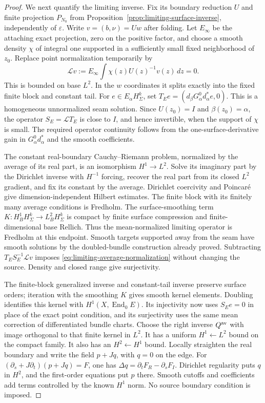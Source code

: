 \documentclass[11pt]{amsart}
\theoremstyle{definition}
\theoremstyle{remark}
\theoremstyle{plain}
\newcommand{\End}{\operatorname{End}}
\begin{document}
\begin{proof}
We next quantify the limiting inverse. Fix its boundary
reduction $U$ and finite projection $P_{N_0}$ from
Proposition~\ref{prop:limiting-surface-inverse}, independently
of $\varepsilon$. Write $v=(b,\nu)=Uw$ after folding. Let
$E_\infty$ be the attaching exact projection, zero on the
positive factor, and choose a smooth density $\chi$ of
integral one supported in a sufficiently small fixed
neighborhood of $z_0$. Replace point normalization temporarily
by
\begin{equation}\label{eq:limiting-average-normalization}
 \mathcal Lv:=E_\infty\int\chi(z)U(z)^{-1}v(z)\,dz=0.
\end{equation}
This is bounded on base $L^2$. In the $w$ coordinates it
splits exactly into the fixed finite block and constant tail.
For $e\in E_\alpha H^k_\Sigma$, set
$T_Ee=(d_\beta G^0_\alpha d_\alpha^*e,0)$. This is a
homogeneous unnormalized seam solution. Since $U(z_0)=I$
and $\beta(z_0)=\alpha$, the operator
$S_E=\mathcal LT_E$ is close to $I$, and hence invertible,
when the support of $\chi$ is small. The required operator
continuity follows from the one-surface-derivative gain in
$G^0_\alpha d_\alpha^*$ and the smooth coefficients.

The constant real-boundary Cauchy--Riemann problem, normalized
by the average of its real part, is an isomorphism
$H^1\to L^2$. Solve its imaginary part by the Dirichlet
inverse with $H^{-1}$ forcing, recover the real part from
its closed $L^2$ gradient, and fix its constant by the average.
Dirichlet coercivity and Poincar\'e give dimension-independent
Hilbert estimates. The finite block with its finitely many
average conditions is Fredholm. The surface-smoothing term
$K:H^1_BH^k_\Sigma\to L^2_BH^k_\Sigma$ is compact by
finite surface compression and finite-dimensional base
Rellich. Thus the mean-normalized limiting operator is
Fredholm at this endpoint. Smooth targets supported away
from the seam have smooth solutions by the doubled-bundle
construction already proved. Subtracting
$T_ES_E^{-1}\mathcal Lv$ imposes
\eqref{eq:limiting-average-normalization} without changing
the source. Density and closed range give surjectivity.

The finite-block generalized inverse and constant-tail inverse
preserve surface orders; iteration with the smoothing $K$
gives smooth kernel elements. Doubling identifies this kernel
with $H^1(X,\End_0E)$. Its injectivity now uses $S_Ee=0$
in place of the exact point condition, and its surjectivity
uses the same mean correction of differentiated bundle charts.
Choose the right inverse $Q^{\rm av}$ with image orthogonal
to that finite kernel in $L^2$. It has a uniform $H^1\leftarrow
L^2$ bound on the compact family. It also has an
$H^2\leftarrow H^1$ bound. Locally straighten the real
boundary and write the field $p+Jq$, with $q=0$ on the edge.
For $(\partial_s+J\partial_t)(p+Jq)=F$, one has
$\Delta q=\partial_tF_R-\partial_sF_I$. Dirichlet regularity
puts $q$ in $H^2$, and the first-order equations put $p$ there.
Smooth cutoffs and coefficients add terms controlled by the
known $H^1$ norm. No source boundary condition is imposed.


\end{proof}
\end{document}
